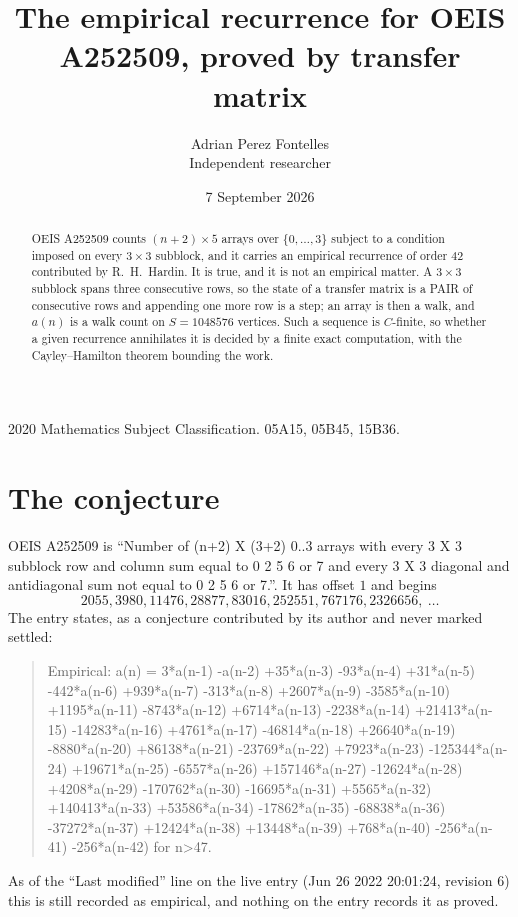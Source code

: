 \documentclass[11pt,a4paper]{article}
\title{The empirical recurrence for OEIS A252509, proved by transfer matrix}
\author{Adrian Perez Fontelles\\ \small Independent researcher}
\date{7 September 2026}
\theoremstyle{plain}
\theoremstyle{definition}
\begin{document}
\maketitle

\begin{abstract}
OEIS A252509 counts $(n+2)\times5$ arrays over $\{0,\dots,3\}$ subject to a condition imposed on
every $3\times3$ subblock, and it carries an empirical recurrence of order $42$
contributed by R.~H.~Hardin. It is true, and it is not an empirical matter. A $3\times3$
subblock spans three consecutive rows, so the state of a transfer matrix is a PAIR of
consecutive rows and appending one more row is a step; an array is then a walk, and
$a(n)$ is a walk count on $S=1048576$ vertices. Such a sequence is $C$-finite, so whether a given
recurrence annihilates it is decided by a finite exact computation, with the Cayley--Hamilton
theorem bounding the work.
\end{abstract}

\noindent\small 2020 Mathematics Subject Classification. 05A15, 05B45, 15B36.\normalsize

\section{The conjecture}

OEIS A252509 is ``Number of (n+2) X (3+2) 0..3 arrays with every 3 X 3 subblock row and column sum equal to 0 2 5 6 or 7 and every 3 X 3 diagonal and antidiagonal sum not equal to 0 2 5 6 or 7.''. It has offset $1$ and begins
\[
2055, 3980, 11476, 28877, 83016, 252551, 767176, 2326656,\ \dots
\]
The entry states, as a conjecture contributed by its author and never marked settled:
\begin{quote}
Empirical: a(n) = 3*a(n-1) -a(n-2) +35*a(n-3) -93*a(n-4) +31*a(n-5) -442*a(n-6) +939*a(n-7) -313*a(n-8) +2607*a(n-9) -3585*a(n-10) +1195*a(n-11) -8743*a(n-12) +6714*a(n-13) -2238*a(n-14) +21413*a(n-15) -14283*a(n-16) +4761*a(n-17) -46814*a(n-18) +26640*a(n-19) -8880*a(n-20) +86138*a(n-21) -23769*a(n-22) +7923*a(n-23) -125344*a(n-24) +19671*a(n-25) -6557*a(n-26) +157146*a(n-27) -12624*a(n-28) +4208*a(n-29) -170762*a(n-30) -16695*a(n-31) +5565*a(n-32) +140413*a(n-33) +53586*a(n-34) -17862*a(n-35) -68838*a(n-36) -37272*a(n-37) +12424*a(n-38) +13448*a(n-39) +768*a(n-40) -256*a(n-41) -256*a(n-42) for n>47.
\end{quote}
As of the ``Last modified'' line on the live entry (Jun 26 2022 20:01:24, revision 6) this is still
recorded as empirical, and nothing on the entry records it as proved.
\end{document}

